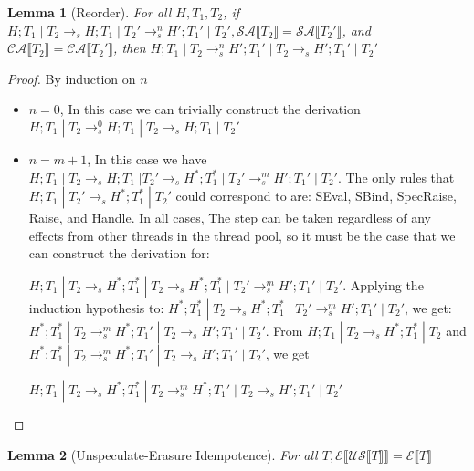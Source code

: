 \documentclass[9pt]{article}
\newtheorem{lemma}{Lemma}
\newcommand\specStep{\rightarrow_{s}}
\newcommand{\erase}[1]{\mathcal{E}\llbracket #1 \rrbracket}
\newcommand{\unSpec}[1]{\mathcal{US} \llbracket #1 \rrbracket}
\newcommand{\specActions}[1]{\mathcal{SA} \llbracket #1 \rrbracket}
\newcommand{\commitActions}[1]{\mathcal{CA} \llbracket #1 \rrbracket}
\begin{document}
\begin{lemma}[Reorder]
\label{reorderLemma}
For all $H, T_1, T_2$, if $H; T_1 \; | \; T_2 \specStep H; T_1 \; | \; T_2' \specStep^n H'; T_1' \; | \; T_2', \specActions{T_2} = \specActions{T_2'}$, and $\commitActions{T_2} = \commitActions{T_2'}$, then $H; T_1 \; | \; T_2 \specStep^n H'; T_1' \; | \; T_2 \specStep H'; T_1' \; | \; T_2'$

\end{lemma}

\begin{proof}

By induction on $n$

\begin{itemize}
\item $n = 0$, In this case we can trivially construct the derivation $H; T_1 \; | \; T_2 \specStep^0 H; T_1 \; | \; T_2 \specStep H; T_1 \; | \; T_2'$

\item $n = m+1$, In this case we have $H; T_1 \; | \; T_2 \specStep H; T_1 \; | T_2' \specStep H^*; T_1^* \; | \; T_2' \specStep^m H'; T_1' \; | \; T_2'$.  The only rules that $H; T_1 \; | \; T_2' \specStep H^*; T_1^* \; | \; T_2'$ could correspond to are: SEval, SBind, SpecRaise, Raise, and Handle.  In all cases, The step can be taken regardless of any effects from other threads in the thread pool, so it must be the case that we can construct the derivation for:

$H; T_1 \; | \; T_2 \specStep H^*; T_1^* \; | \; T_2 \specStep H^*; T_1^* \; | \; T_2' \specStep^m H'; T_1' \; | \; T_2'$.  Applying the induction hypothesis to: $H^*; T_1^* \; | \; T_2 \specStep H^*; T_1^* \; | \; T_2' \specStep^m H'; T_1' \; | \; T_2'$, we get: $H^*; T_1^* \; | \; T_2 \specStep^m H^*; T_1' \; | \; T_2 \specStep H'; T_1' \; | \; T_2'$.  From 
$H; T_1 \; | \; T_2 \specStep H^*; T_1^* \; | \; T_2$ and $H^*; T_1^* \; | \; T_2 \specStep^m H^*; T_1' \; | \; T_2 \specStep H'; T_1' \; | \; T_2'$, we get

$H; T_1\; | \; T_2 \specStep H^*; T_1^* \; | \; T_2 \specStep^m H^*; T_1' \; | \; T_2 \specStep H'; T_1' \; | \; T_2'$
\end{itemize}

\end{proof}


\begin{lemma}[Unspeculate-Erasure Idempotence]
\label{usEraseIdem}
For all $T, \erase{\unSpec{T}} = \erase{T}$

\end{lemma}
\end{document}
